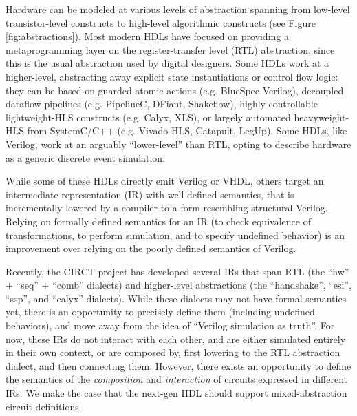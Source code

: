 \documentclass[sigplan,review,nonacm]{acmart}
\begin{document}

Hardware can be modeled at various levels of abstraction spanning from low-level transistor-level constructs to high-level algorithmic constructs (see Figure \ref{fig:abstractions}).
Most modern HDLs have focused on providing a metaprogramming layer on the register-transfer level (RTL) abstraction, since this is the usual abstraction used by digital designers.
Some HDLs work at a higher-level, abstracting away explicit state instantiations or control flow logic: they can be based on guarded atomic actions (e.g. BlueSpec Verilog\cite{bluespecverilog}), decoupled dataflow pipelines (e.g. PipelineC\cite{pipelinec}, DFiant\cite{dfiant}, Shakeflow\cite{shakeflow}), highly-controllable lightweight-HLS constructs (e.g. Calyx\cite{calyx}, XLS\cite{xls}), or largely automated heavyweight-HLS from SystemC/C++ (e.g. Vivado HLS, Catapult, LegUp\cite{legup}).
Some HDLs, like Verilog, work at an arguably ``lower-level'' than RTL, opting to describe hardware as a generic discrete event simulation.


While some of these HDLs directly emit Verilog or VHDL, others target an intermediate representation (IR) with well defined semantics, that is incrementally lowered by a compiler to a form resembling structural Verilog.
%
Relying on formally defined semantics for an IR (to check equivalence of transformations, to perform simulation\cite{hwsemantics}, and to specify undefined behavior) is an improvement\cite{cider} over relying on the poorly defined semantics of Verilog.


Recently, the CIRCT project\cite{circt} has developed several IRs that span RTL (the ``hw'' + ``seq'' + ``comb'' dialects) and higher-level abstractions (the ``handshake'', ``esi'', ``ssp'', and ``calyx''\cite{calyx} dialects).
While these dialects may not have formal semantics yet, there is an opportunity to precisely define them (including undefined behaviors), and move away from the idea of ``Verilog simulation as truth''.
For now, these IRs do not interact with each other, and are either simulated entirely in their own context, or are composed by, first lowering to the RTL abstraction dialect, and then connecting them.
However, there exists an opportunity to define the semantics of the \textit{composition} and \textit{interaction} of circuits expressed in different IRs.
We make the case that the next-gen HDL should support mixed-abstraction circuit definitions.
\end{document}
